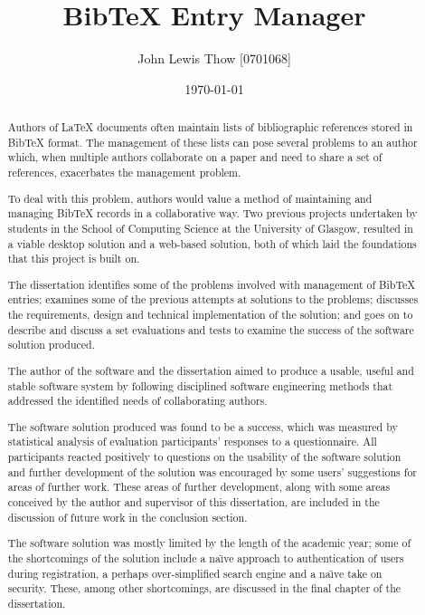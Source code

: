 \documentclass{l4proj}
\newcommand{\BibTeX}{B{\sc ib}\TeX}
\newcommand{\bibtex}{\BibTeX}
\newcommand{\latex}{\LaTeX{} }
\newcommand{\cs}{C\#}
\newcommand{\naive}{na\"{\i}ve}
\begin{document}
\title{\bibtex{} Entry Manager}
\author{John Lewis Thow [0701068]}
\date{\today}
\maketitle


\begin{abstract}
Authors of \latex documents often maintain lists of bibliographic references stored in \bibtex{} format.  The management of these lists can pose several problems to an author which, when multiple authors collaborate on a paper and need to share a set of references, exacerbates the management problem. 

To deal with this problem, authors would value a method of maintaining and managing \bibtex{} records in a collaborative way.  Two previous projects undertaken by students in the School of Computing Science at the University of Glasgow, resulted in a viable desktop solution and a web-based solution, both of which laid the foundations that this project is built on.

The dissertation identifies some of the problems involved with management of \bibtex{} entries; examines some of the previous attempts at solutions to the problems; discusses the requirements, design and technical implementation of the solution; and goes on to describe and discuss a set evaluations and tests to examine the success of the software solution produced.

The author of the software and the dissertation aimed to produce a usable, useful and stable software system by following disciplined software engineering methods that addressed the identified needs of collaborating authors.

The software solution produced was found to be a success,  which was measured by statistical analysis of evaluation participants' responses to a questionnaire.  All participants reacted positively to questions on the usability of the software solution and further development of the solution was encouraged by some users' suggestions for areas of further work.  These areas of further development, along with some areas conceived by the author and supervisor of this dissertation, are included in the discussion of future work in the conclusion section.

The software solution was mostly limited by the length of the academic year; some of the shortcomings of the solution include a \naive{} approach to authentication of users during registration, a perhaps over-simplified search engine and a \naive{} take on security.  These, among other shortcomings, are discussed in the final chapter of the dissertation.

\end{abstract}
\end{document}
